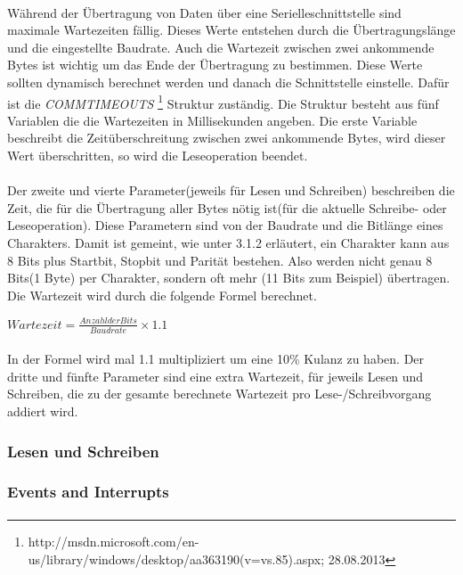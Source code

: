 \paragraph{}
Während der Übertragung von Daten über eine Serielleschnittstelle sind maximale Wartezeiten fällig. Dieses Werte entstehen durch die Übertragungslänge und die eingestellte Baudrate. Auch die Wartezeit zwischen zwei ankommende Bytes ist wichtig um das Ende der Übertragung zu bestimmen. Diese Werte sollten dynamisch berechnet werden und danach die Schnittstelle einstelle. Dafür ist die \textit{COMMTIMEOUTS} \footnote{http://msdn.microsoft.com/en-us/library/windows/desktop/aa363190(v=vs.85).aspx; 28.08.2013} Struktur zuständig. Die Struktur besteht aus fünf Variablen die die Wartezeiten in Millisekunden angeben. Die erste Variable beschreibt die Zeitüberschreitung zwischen zwei ankommende Bytes, wird dieser Wert überschritten, so wird die Leseoperation beendet.

\paragraph{}
Der zweite und vierte Parameter(jeweils für Lesen und Schreiben) beschreiben die Zeit, die für die Übertragung aller Bytes nötig ist(für die aktuelle Schreibe- oder Leseoperation). Diese Parametern sind von der Baudrate und die Bitlänge eines Charakters. Damit ist gemeint, wie unter 3.1.2 erläutert, ein Charakter kann aus 8 Bits plus Startbit, Stopbit und Parität bestehen. Also werden nicht genau 8 Bits(1 Byte) per Charakter, sondern oft mehr (11 Bits zum Beispiel) übertragen. Die Wartezeit wird durch die folgende Formel berechnet.

\begin{center}
$ Wartezeit = \frac{Anzahl der Bits}{Baudrate} \times 1.1$
\end{center}

\paragraph{}
In der Formel wird mal 1.1 multipliziert um eine 10\% Kulanz zu haben. Der dritte und fünfte Parameter sind eine extra Wartezeit, für jeweils Lesen und Schreiben, die zu der gesamte berechnete Wartezeit pro Lese-/Schreibvorgang addiert wird.

\subsubsection{Lesen und Schreiben}
\paragraph{}


\subsubsection{Events and Interrupts}
\paragraph{}